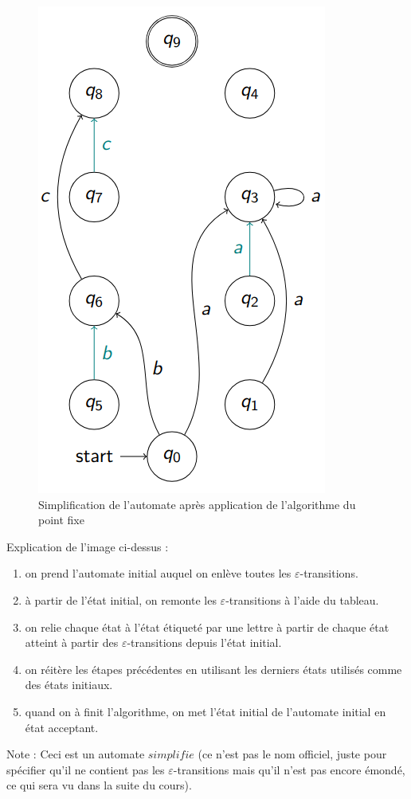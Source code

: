 \documentclass{article}
\begin{document}
\begin{figure}[h]
    \centering
    \includegraphics[scale=0.4]{simplified.png}
    \caption{Simplification de l'automate après application de l'algorithme du point fixe}
\end{figure}

Explication de l'image ci-dessus : 
\begin{enumerate}
    \item on prend l'automate initial auquel on enlève toutes les $\varepsilon$-transitions.
    \item à partir de l'état initial, on remonte les $\varepsilon$-transitions à l'aide du tableau.
    \item on relie chaque état à l'état étiqueté par une lettre à partir de chaque état atteint à partir des $\varepsilon$-transitions depuis l'état initial.
    \item on réitère les étapes précédentes en utilisant les derniers états utilisés comme des états initiaux.
    \item quand on à finit l'algorithme, on met l'état initial de l'automate initial en état acceptant.
\end{enumerate}
Note : Ceci est un automate $simplifie$ (ce n'est pas le nom officiel, juste pour spécifier qu'il ne contient pas les $\varepsilon$-transitions mais qu'il n'est pas encore émondé, ce qui sera vu dans la suite du cours).
\newpage
\end{document}
